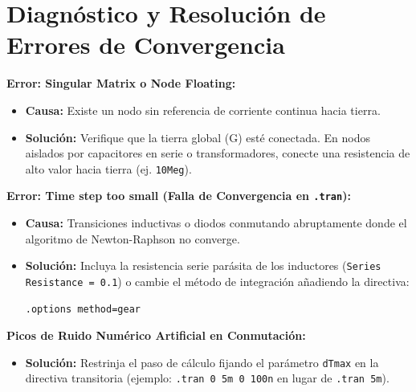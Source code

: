 \documentclass[11pt, a4paper]{article}
\begin{document}
\section{Diagnóstico y Resolución de Errores de Convergencia}

\textbf{Error: Singular Matrix o Node Floating:}
\begin{itemize}
    \item \textbf{Causa:} Existe un nodo sin referencia de corriente continua hacia tierra.
    \item \textbf{Solución:} Verifique que la tierra global (G) esté conectada. En nodos aislados por capacitores en serie o transformadores, conecte una resistencia de alto valor hacia tierra (ej. \texttt{10Meg}).
\end{itemize}

\textbf{Error: Time step too small (Falla de Convergencia en \texttt{.tran}):}
\begin{itemize}
    \item \textbf{Causa:} Transiciones inductivas o diodos conmutando abruptamente donde el algoritmo de Newton-Raphson no converge.
    \item \textbf{Solución:} Incluya la resistencia serie parásita de los inductores (\texttt{Series Resistance = 0.1}) o cambie el método de integración añadiendo la directiva:
\begin{lstlisting}[style=spicestyle]
.options method=gear
\end{lstlisting}
\end{itemize}

\textbf{Picos de Ruido Numérico Artificial en Conmutación:}
\begin{itemize}
    \item \textbf{Solución:} Restrinja el paso de cálculo fijando el parámetro \texttt{dTmax} en la directiva transitoria (ejemplo: \texttt{.tran 0 5m 0 100n} en lugar de \texttt{.tran 5m}).
\end{itemize}

\end{document}
